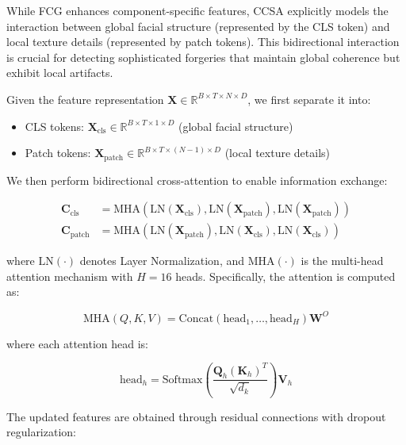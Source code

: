 While FCG enhances component-specific features, CCSA explicitly models the interaction between global facial structure (represented by the CLS token) and local texture details (represented by patch tokens). This bidirectional interaction is crucial for detecting sophisticated forgeries that maintain global coherence but exhibit local artifacts.

Given the feature representation $\mathbf{X} \in \mathbb{R}^{B \times T \times N \times D}$, we first separate it into:

\begin{itemize}
\item CLS tokens: $\mathbf{X}_{\text{cls}} \in \mathbb{R}^{B \times T \times 1 \times D}$ (global facial structure)
\item Patch tokens: $\mathbf{X}_{\text{patch}} \in \mathbb{R}^{B \times T \times (N-1) \times D}$ (local texture details)
\end{itemize}

We then perform bidirectional cross-attention to enable information exchange:

\begin{equation}
\begin{aligned}
\mathbf{C}_{\text{cls}} &= \text{MHA}(\text{LN}(\mathbf{X}_{\text{cls}}), \text{LN}(\mathbf{X}_{\text{patch}}), \text{LN}(\mathbf{X}_{\text{patch}})) \\
\mathbf{C}_{\text{patch}} &= \text{MHA}(\text{LN}(\mathbf{X}_{\text{patch}}), \text{LN}(\mathbf{X}_{\text{cls}}), \text{LN}(\mathbf{X}_{\text{cls}}))
\end{aligned}
\end{equation}

where $\text{LN}(\cdot)$ denotes Layer Normalization, and $\text{MHA}(\cdot)$ is the multi-head attention mechanism with $H=16$ heads. Specifically, the attention is computed as:

\begin{equation}
\text{MHA}(Q, K, V) = \text{Concat}(\text{head}_1, \ldots, \text{head}_H) \mathbf{W}^O
\end{equation}

where each attention head is:

\begin{equation}
\text{head}_h = \text{Softmax}\left(\frac{\mathbf{Q}_h (\mathbf{K}_h)^T}{\sqrt{d_k}}\right) \mathbf{V}_h
\end{equation}

The updated features are obtained through residual connections with dropout regularization:

